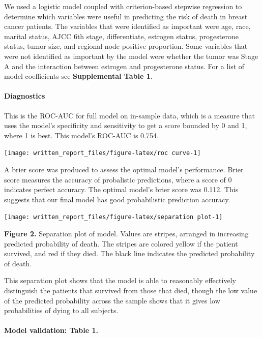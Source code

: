 \documentclass[]{article}
\let\oldparagraph\paragraph
\renewcommand{\paragraph}[1]{\oldparagraph{#1}\mbox{}}
\begin{document}
We used a logistic model coupled with criterion-based stepwise
regression to determine which variables were useful in predicting the
risk of death in breast cancer patients. The variables that were
identified as important were age, race, marital status, AJCC 6th stage,
differentiate, estrogen status, progesterone status, tumor size, and
regional node positive proportion. Some variables that were not
identified as important by the model were whether the tumor was Stage A
and the interaction between estrogen and progesterone status. For a list
of model coefficients see \textbf{Supplemental Table 1}.

\hypertarget{diagnostics}{%
\paragraph{Diagnostics}\label{diagnostics}}

This is the ROC-AUC for full model on in-sample data, which is a measure
that uses the model's specificity and sensitivity to get a score bounded
by 0 and 1, where 1 is best. This model's ROC-AUC is 0.754.

\texttt{[image: written\_report\_files/figure-latex/roc curve-1]}

A brier score was produced to assess the optimal model's performance.
Brier score measures the accuracy of probalistic predictions, where a
score of 0 indicates perfect accuracy. The optimal model's brier score
was 0.112. This suggests that our final model has good probabilistic
prediction accuracy.

\texttt{[image: written\_report\_files/figure-latex/separation plot-1]}

\textbf{Figure 2.} Separation plot of model. Values are stripes,
arranged in increasing predicted probability of death. The stripes are
colored yellow if the patient survived, and red if they died. The black
line indicates the predicted probability of death.

This separation plot shows that the model is able to reasonably
effectively distinguish the patients that survived from those that died,
though the low value of the predicted probability across the sample
shows that it gives low probabilities of dying to all subjects.

\hypertarget{model-validation-table-1.}{%
\paragraph{Model validation: Table 1.}\label{model-validation-table-1.}}
\end{document}
